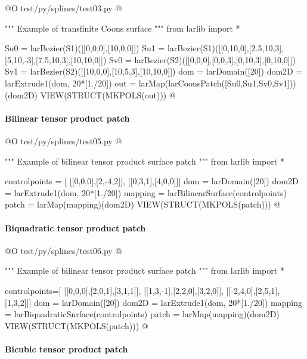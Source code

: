 \documentclass[11pt,oneside]{article}	%
\begin{document}
@O test/py/splines/test03.py  
@{""" Example of transfinite Coons surface """
from larlib import *

Su0 = larBezier(S1)([[0,0,0],[10,0,0]])
Su1 = larBezier(S1)([[0,10,0],[2.5,10,3],[5,10,-3],[7.5,10,3],[10,10,0]])
Sv0 = larBezier(S2)([[0,0,0],[0,0,3],[0,10,3],[0,10,0]])
Sv1 = larBezier(S2)([[10,0,0],[10,5,3],[10,10,0]])
dom = larDomain([20])
dom2D = larExtrude1(dom, 20*[1./20])
out = larMap(larCoonsPatch([Su0,Su1,Sv0,Sv1]))(dom2D)
VIEW(STRUCT(MKPOLS(out)))
@}


\paragraph{Bilinear tensor product patch}


@O test/py/splines/test05.py
@{""" Example of bilinear tensor product surface patch """
from larlib import *

controlpoints = [
	[[0,0,0],[2,-4,2]],
	[[0,3,1],[4,0,0]]]
dom = larDomain([20])
dom2D = larExtrude1(dom, 20*[1./20])
mapping = larBilinearSurface(controlpoints)
patch = larMap(mapping)(dom2D)
VIEW(STRUCT(MKPOLS(patch)))
@}

\paragraph{Biquadratic tensor product patch}

@O test/py/splines/test06.py
@{""" Example of bilinear tensor product surface patch """
from larlib import *

controlpoints=[
	[[0,0,0],[2,0,1],[3,1,1]],
	[[1,3,-1],[2,2,0],[3,2,0]],
	[[-2,4,0],[2,5,1],[1,3,2]]]
dom = larDomain([20])
dom2D = larExtrude1(dom, 20*[1./20])
mapping = larBiquadraticSurface(controlpoints)
patch = larMap(mapping)(dom2D)
VIEW(STRUCT(MKPOLS(patch)))
@}


\paragraph{Bicubic tensor product patch}
\end{document}
